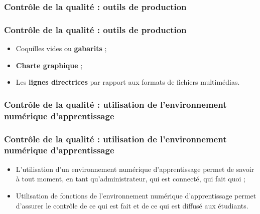 					\subsubsection{Contrôle de la qualité : outils de production} 
							\begin{frame}
							\frametitle{Contrôle de la qualité : outils de production}
                        			
							\begin{itemize}
							
							\item Coquilles vides ou \textbf{gabarits} ;
							\item \textbf{Charte graphique} ;
							\item Les \textbf{lignes directrices} par rapport aux formats de fichiers multimédias.
												
							\end{itemize}						
					\end{frame}	
					\subsubsection{Contrôle de la qualité : utilisation de l'environnement numérique d'apprentissage} 
							\begin{frame}
							\frametitle{Contrôle de la qualité : utilisation de l'environnement numérique d'apprentissage}
                        			
							\begin{itemize}
							\item L’utilisation d'un environnement numérique d'apprentissage permet de savoir à tout moment, en tant qu’administrateur, qui est connecté, qui fait quoi ;
							\item Utilisation de fonctions de l'environnement numérique d'apprentissage permet d’assurer le contrôle de ce qui est fait et de ce qui est diffusé aux étudiants.
							\end{itemize}						
					\end{frame}	
